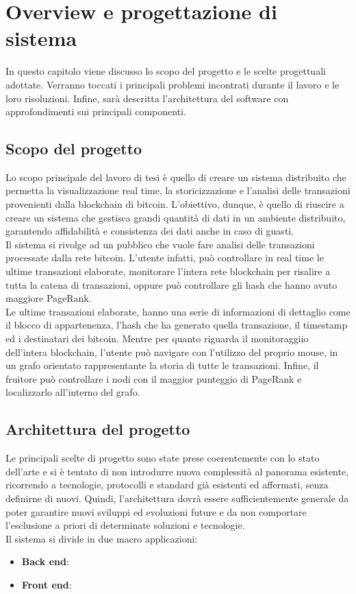 \chapter{Overview e progettazione di sistema}
\label{chap:overview e progettazione di sistema}
In questo capitolo viene discusso lo scopo del progetto e le scelte progettuali adottate. Verranno toccati i principali problemi incontrati durante il lavoro e le loro risoluzioni. Infine, sarà descritta l'architettura del software con approfondimenti sui principali componenti.

\section{Scopo del progetto}
\label{sec:scopo del progetto}
Lo scopo principale del lavoro di tesi è quello di creare un sistema distribuito che permetta la visualizzazione real time, la storicizzazione e l'analisi delle transazioni  provenienti dalla blockchain di bitcoin. L'obiettivo, dunque, è quello di riuscire a creare un sistema che gestisca grandi quantità di dati in un ambiente distribuito, garantendo affidabilità e consistenza dei dati anche in caso di guasti.
\\Il sistema si rivolge ad un pubblico che vuole fare analisi delle transazioni processate dalla rete bitcoin. L'utente infatti, può controllare in real time le ultime transazioni elaborate, monitorare l'intera rete blockchain per risalire a tutta la catena di transazioni, oppure può controllare gli hash che hanno avuto maggiore PageRank.
\\Le ultime transazioni elaborate, hanno una serie di informazioni di dettaglio come il blocco di appartenenza, l'hash che ha generato quella transazione, il timestamp ed i destinatari dei bitcoin. Mentre per quanto riguarda il monitoraggiio dell'intera blockchain, l'utente può navigare con l'utilizzo del proprio mouse, in un grafo orientato rappresentante la storia di tutte le transazioni. Infine, il fruitore può controllare i nodi con il maggior punteggio di PageRank e localizzarlo all'interno del grafo.  

\section{Architettura  del progetto}
\label{sec:architettura del progetto}
Le principali scelte di progetto sono state prese coerentemente con lo stato dell’arte e si è tentato di non introdurre nuova complessità al panorama esistente, ricorrendo a tecnologie, protocolli e standard già esistenti ed affermati, senza definirne di nuovi. Quindi, l’architettura dovrà essere sufficientemente generale da poter garantire nuovi sviluppi ed evoluzioni future e da non comportare l’esclusione a priori di determinate soluzioni e tecnologie. 
\\Il sistema si divide in due macro applicazioni:
\begin{itemize}
	\item \textbf{Back end}: 
	\item \textbf{Front end}:
\end{itemize} 

